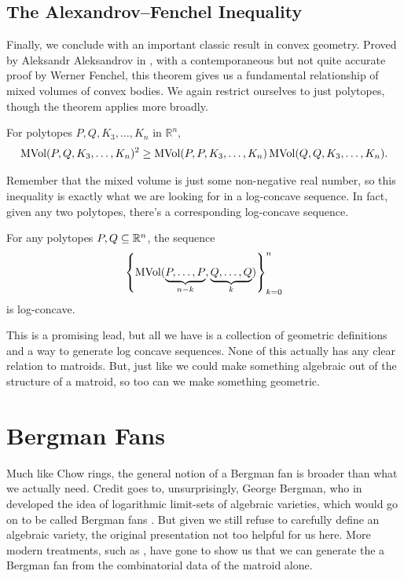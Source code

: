 \documentclass[12pt,oneside]{../../sfsuthesis}
\begin{document}
\subsection{The Alexandrov–Fenchel Inequality}
Finally, we conclude with an important classic result in convex geometry.
Proved by Aleksandr Aleksandrov in \cite{aleksandrovZurTheorieGemischter1937}, with a contemporaneous but not quite accurate proof by Werner Fenchel, this theorem gives us a fundamental relationship of mixed volumes of convex bodies.
We again restrict ourselves to just polytopes, though the theorem applies more broadly.
\begin{theorem}\th\label{thm:AFIneq}
    For polytopes \( P, Q, K_3, \dots, K_n \) in \( \mathbb{R}^n \),
    \begin{gather*}
        \operatorname{MVol}(P,Q, K_3, \dots, K_n)^2 \geq \operatorname{MVol}( P, P, K_3, \dots, K_n) \operatorname{MVol}( Q, Q, K_3, \dots, K_n).
    \end{gather*}
\end{theorem}
Remember that the mixed volume is just some non-negative real number, so this inequality is exactly what we are looking for in a log-concave sequence.
In fact, given any two polytopes, there's a corresponding log-concave sequence.
\begin{corollary}\th\label{thm:AFSequence}
    For any polytopes \( P, Q \subseteq \mathbb{R}^n \), the sequence
    \[
        \left\{ \operatorname{MVol}(\underbrace{P,\ldots,P}_{n-k},\underbrace{Q,\ldots,Q}_{k}) \right\}_{k=0}^{n}
    \]
    is log-concave.
\end{corollary}

This is a promising lead, but all we have is a collection of geometric definitions and a way to generate log concave sequences.
None of this actually has any clear relation to matroids.
But, just like we could make something algebraic out of the structure of a matroid, so too can we make something geometric.

\section{Bergman Fans}
Much like Chow rings, the general notion of a Bergman fan is broader than what we actually need.
Credit goes to, unsurprisingly, George Bergman, who in \cite{bergmanLogarithmicLimitsetAlgebraic1971} developed the idea of logarithmic limit-sets of algebraic varieties, which would go on to be called Bergman fans \cite{feichtnerMatroidPolytopesNested2005}.
But given we still refuse to carefully define an algebraic variety, the original presentation not too helpful for us here.
More modern treatments, such as \cite{ardilaBergmanComplexMatroid2006,huhLogconcavityCharacteristicPolynomials2012}, have gone to show us that we can generate the a Bergman fan from the combinatorial data of the matroid alone.
\end{document}
